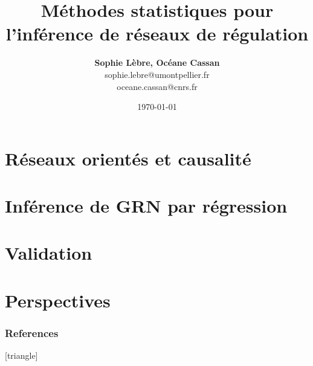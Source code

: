\documentclass[xcolor=dvipsnames]{beamer}
\title[L'inférence statistique de GRN]{Méthodes statistiques pour l'inférence de réseaux de régulation}
\date{\today}
\author[Sophie Lèbre, Océane Cassan]
{\textbf{Sophie Lèbre, Océane Cassan} \\ sophie.lebre@umontpellier.fr\\ oceane.cassan@cnrs.fr }
\institute[]{Formation réseaux de régulation, IRD}
\begin{document}
	
	\begin{frame}
		\titlepage
	\end{frame}
	
	\begin{frame}
		\tableofcontents
	\end{frame}
	
	

    
\section{Réseaux orientés et causalité}

    	

   
      
  	
\section{Inférence de GRN par régression}




    
    
    
    
    
    
    
\section{Validation}
    
    
    
	
	
\section{Perspectives}

	


\begin{frame}[allowframebreaks]
    \frametitle{References}
    [triangle]
    \scriptsize
    
    
\end{frame}
\end{document}
